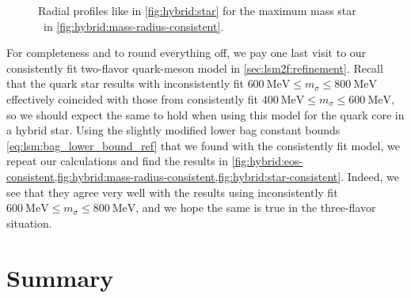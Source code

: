 \begin{figure}
\caption{\label{fig:hybrid:star-consistent}%
	Radial profiles like in \cref{fig:hybrid:star} for the maximum mass star \goldenstar in \cref{fig:hybrid:mass-radius-consistent}.
}
\end{figure}

For completeness and to round everything off,
we pay one last visit to our consistently fit two-flavor quark-meson model in \cref{sec:lsm2f:refinement}.
Recall that the quark star results with inconsistently fit $\SI{600}{\mega\electronvolt} \leq m_\sigma \leq \SI{800}{\mega\electronvolt}$
effectively coincided with those from consistently fit $\SI{400}{\mega\electronvolt} \leq m_\sigma \leq \SI{600}{\mega\electronvolt}$,
so we should expect the same to hold when using this model for the quark core in a hybrid star.
Using the slightly modified lower bag constant bounds \eqref{eq:lsm:bag_lower_bound_ref} that we found with the consistently fit model,
we repeat our calculations and find the results in \cref{fig:hybrid:eos-consistent,fig:hybrid:mass-radius-consistent,fig:hybrid:star-consistent}.
Indeed, we see that they agree very well with the results using inconsistently fit $\SI{600}{\mega\electronvolt} \leq m_\sigma \leq \SI{800}{\mega\electronvolt}$,
and we hope the same is true in the three-flavor situation.

\section{Summary}

